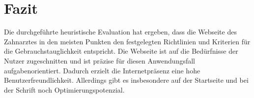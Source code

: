 \section{Fazit} \label{sec:fazit}

Die durchgeführte heuristische Evaluation hat ergeben, dass die Webseite des Zahnarztes in den meisten Punkten den festgelegten Richtlinien und Kriterien für die Gebrauchstauglichkeit entspricht. Die Webseite ist auf die Bedürfnisse der Nutzer zugeschnitten und ist präzise für diesen Anwendungsfall aufgabenorientiert. Dadurch erzielt die Internetpräsenz eine hohe Benutzerfreundlichkeit. Allerdings gibt es insbesondere auf der Startseite und bei der Schrift noch Optimierungspotenzial. 